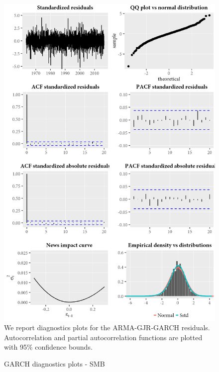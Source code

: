 \begin{figure}[H]
  \caption{GARCH diagnostics plots - SMB}
  \label{diag:garchdiagSMB}
  \toprule
  \centering
  \begin{minipage}{\textwidth}
  \includegraphics[scale=1]{graphics/garch/garch_diagnosticsSMB.png}  
  \bottomrule
  \vspace{3mm}
  \footnotesize
  We report diagnostics plots for the ARMA-GJR-GARCH residuals. Autocorrelation and partial autocorrelation functions are plotted with 95\% confidence bounds.
  \end{minipage}
\end{figure}
